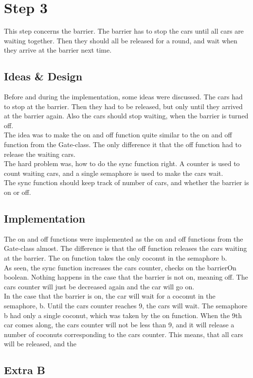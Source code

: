 \section{Step 3}
This step concerns the barrier. The barrier has to stop the cars until all cars are waiting together. Then they should all be released for a round, and wait when they arrive at the barrier next time.

\subsection{Ideas \& Design}
Before and during the implementation, some ideas were discussed. The cars had to stop at the barrier. Then they had to be released, but only until they arrived at the barrier again. Also the cars should stop waiting, when the barrier is turned off. \\
The idea was to make the on and off function quite similar to the on and off function from the Gate-class. The only difference it that the off function had to release the waiting cars.\\ 
The hard problem was, how to do the sync function right. A counter is used to count waiting cars, and a single semaphore is used to make the cars wait. \\
The sync function should keep track of number of cars, and whether the barrier is on or off.

\subsection{Implementation}
The on and off functions were implemented as the on and off functions from the Gate-class almost. The difference is that the off function releases the cars waiting at the barrier. The on function takes the only coconut in the semaphore b.\\

As seen, the sync function increases the cars counter, checks on the barrierOn boolean. Nothing happens in the case that the barrier is not on, meaning off. The cars counter will just be decreased again and the car will go on. \\
In the case that the barrier is on, the car will wait for a coconut in the semaphore, b. Until the cars counter reaches 9, the cars will wait. The semaphore b had only a single coconut, which was taken by the on function. When the 9th car comes along, the cars counter will not be less than 9, and it will release a number of coconuts corresponding to the cars counter. This means, that all cars will be released, and the 

\subsection{Extra B}
